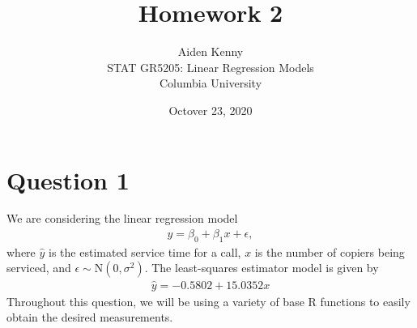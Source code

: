 \documentclass[10pt]{article}
\title{
    {\Large Homework 2}
}
\author{
    {\normalsize Aiden Kenny}\\
    {\normalsize STAT GR5205: Linear Regression Models}\\
    {\normalsize Columbia University}
}
\date{\normalsize Octover 23, 2020}
\begin{document}
\maketitle

\section{Question 1} \noindent
We are considering the linear regression model 
\begin{align*}
    y = \beta_0 + \beta_1 x + \epsilon,
\end{align*}
where \(\hat{y}\) is the estimated service time for a call, \(x\) is the number of copiers being serviced,
and \(\epsilon \sim \mathrm{N}(0,\sigma^2)\). 
The least-squares estimator model is given by 
\begin{align}
    \hat{y} = -0.5802 + 15.0352x \label{copier-lm}
\end{align}
Throughout this question, we will be using a variety of base R functions to easily obtain the desired measurements. 
\end{document}
